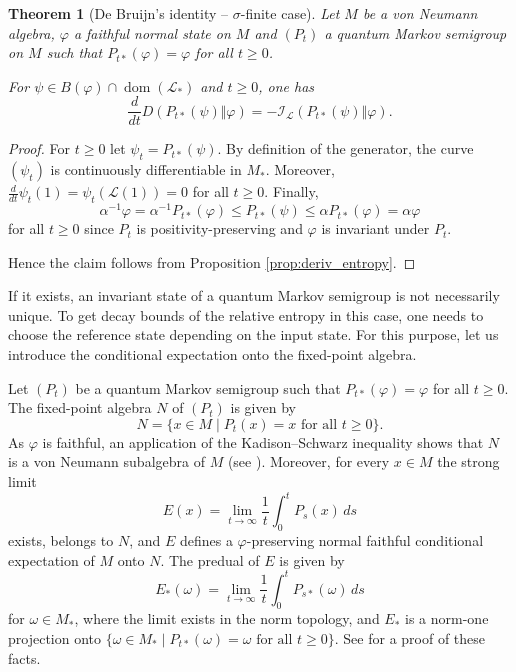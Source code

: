 \documentclass[12pt,a4paper]{amsart}
\newcommand{\1}{\mathds{1}}
\renewcommand{\phi}{\varphi}
\newcommand{\I}{\mathcal I}
\renewcommand{\L}{\mathcal L}
\newcommand{\dom}{\operatorname{dom}}
\theoremstyle{plain}
\newtheorem{theorem}[proposition]{Theorem}
\theoremstyle{definition}
\theoremstyle{remark}
\begin{document}
\begin{theorem}[De Bruijn's identity -- $\sigma$-finite case]\label{thm:DeBruijn_general}
Let $M$ be a von Neumann algebra, $\phi$ a faithful normal state on $M$ and $(P_t)$ a quantum Markov semigroup on $M$ such that $P_{t\ast}(\phi)=\phi$ for all $t\geq 0$.

For $\psi\in B(\phi)\cap \dom(\L_\ast)$ and $t\geq 0$, one has
\begin{equation*}
\frac{d}{dt}D(P_{t\ast}(\psi)\Vert \phi)=-\I_\L(P_{t\ast}(\psi)\Vert \phi).
\end{equation*}
\end{theorem}
\begin{proof}
For $t\geq 0$ let $\psi_t=P_{t\ast}(\psi)$. By definition of the generator, the curve $(\psi_t)$ is continuously differentiable in $M_\ast$. Moreover, $\frac{d}{dt}\psi_t(1)=\psi_t(\L(1))=0$ for all $t\geq 0$. Finally, 
\begin{equation*}
\alpha^{-1}\phi=\alpha^{-1}P_{t\ast}(\phi)\leq P_{t\ast}(\psi)\leq \alpha P_{t\ast}(\phi)=\alpha\phi
\end{equation*}
for all $t\geq 0$ since $P_t$ is positivity-preserving and $\phi$ is invariant under $P_t$.

Hence the claim follows from Proposition \ref{prop:deriv_entropy}.
\end{proof}

If it exists, an invariant state of a quantum Markov semigroup is not necessarily unique. To get decay bounds of the relative entropy in this case, one needs to choose the reference state depending on the input state. For this purpose, let us introduce the conditional expectation onto the fixed-point algebra.

Let $(P_t)$ be a quantum Markov semigroup such that $P_{t\ast}(\phi)=\phi$ for all $t\geq 0$. The fixed-point algebra $N$ of $(P_t)$ is given by 
\begin{equation*}
N=\{x\in M\mid P_t(x)=x\text{ for all }t\geq 0\}.
\end{equation*}
As $\phi$ is faithful, an application of the Kadison--Schwarz inequality shows that $N$ is a von Neumann subalgebra of $M$ (see \cite[Section 2]{Wat79}). Moreover, for every $x\in M$ the strong limit
\begin{equation*}
E(x)=\lim_{t\to\infty}\frac 1 t\int_0^t P_s(x)\,ds
\end{equation*}
exists, belongs to $N$, and $E$ defines a $\phi$-preserving normal faithful conditional expectation of $M$ onto $N$. The predual of $E$ is given by
\begin{equation*}
E_\ast(\omega)=\lim_{t\to\infty}\frac 1 t\int_0^t P_{s\ast}(\omega)\,ds
\end{equation*}
for $\omega\in M_\ast$, where the limit exists in the norm topology, and $E_\ast$ is a norm-one projection onto $\{\omega\in M_\ast\mid P_{t\ast}(\omega)=\omega\text{ for all }t\geq 0\}$. See \cite[Theorem A]{Wat79} for a proof of these facts.
\end{document}
